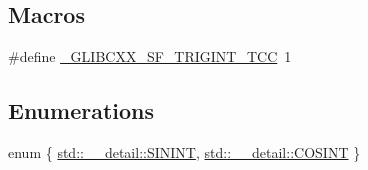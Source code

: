 \subsection*{Macros}
\begin{DoxyCompactItemize}
\item 
\#define \hyperlink{sf__trigint_8tcc_afde1ee684ded2155f3a3b305a31bb18e}{\+\_\+\+G\+L\+I\+B\+C\+X\+X\+\_\+\+S\+F\+\_\+\+T\+R\+I\+G\+I\+N\+T\+\_\+\+T\+C\+C}~1
\end{DoxyCompactItemize}
\subsection*{Enumerations}
\begin{DoxyCompactItemize}
\item 
enum \{ \hyperlink{namespacestd_1_1____detail_a354c633cb3e397eae4c31776b2d67923a0fef08e2967964a1421753c5d738c838}{std\+::\+\_\+\+\_\+detail\+::\+S\+I\+N\+I\+N\+T}, 
\hyperlink{namespacestd_1_1____detail_a354c633cb3e397eae4c31776b2d67923a4b5ea0190e37e477a2874e231190489e}{std\+::\+\_\+\+\_\+detail\+::\+C\+O\+S\+I\+N\+T}
 \}
\end{DoxyCompactItemize}

